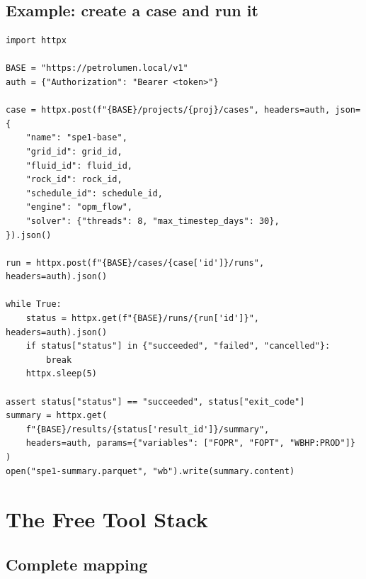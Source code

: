 \documentclass[11pt,a4paper]{article}
\begin{document}
\subsection{Example: create a case and run it}

\begin{lstlisting}[caption={End-to-end API usage from Python.}]
import httpx

BASE = "https://petrolumen.local/v1"
auth = {"Authorization": "Bearer <token>"}

case = httpx.post(f"{BASE}/projects/{proj}/cases", headers=auth, json={
    "name": "spe1-base",
    "grid_id": grid_id,
    "fluid_id": fluid_id,
    "rock_id": rock_id,
    "schedule_id": schedule_id,
    "engine": "opm_flow",
    "solver": {"threads": 8, "max_timestep_days": 30},
}).json()

run = httpx.post(f"{BASE}/cases/{case['id']}/runs", headers=auth).json()

while True:
    status = httpx.get(f"{BASE}/runs/{run['id']}", headers=auth).json()
    if status["status"] in {"succeeded", "failed", "cancelled"}:
        break
    httpx.sleep(5)

assert status["status"] == "succeeded", status["exit_code"]
summary = httpx.get(
    f"{BASE}/results/{status['result_id']}/summary",
    headers=auth, params={"variables": ["FOPR", "FOPT", "WBHP:PROD"]}
)
open("spe1-summary.parquet", "wb").write(summary.content)
\end{lstlisting}

\section{The Free Tool Stack}

\subsection{Complete mapping}
\end{document}
